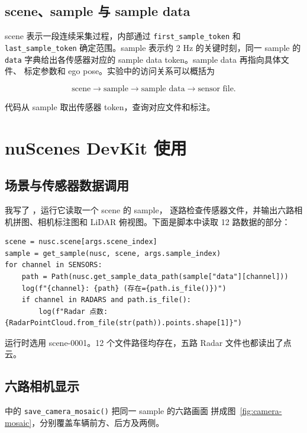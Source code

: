 \documentclass[UTF8,zihao=5,scheme=chinese]{ctexart}
\begin{document}
\subsection{scene、sample 与 sample data}

scene 表示一段连续采集过程，内部通过 \texttt{first\_sample\_token} 和
\texttt{last\_sample\_token} 确定范围。sample 表示约 2 Hz 的关键时刻，同一 sample 的
\texttt{data} 字典给出各传感器对应的 sample data token。sample data 再指向具体文件、
标定参数和 ego pose。实验中的访问关系可以概括为

\begin{equation}
  \text{scene} \rightarrow \text{sample} \rightarrow
  \text{sample data} \rightarrow \text{sensor file}.
\end{equation}

代码从 sample 取出传感器 token，查询对应文件和标注。

\section{nuScenes DevKit 使用}

\subsection{场景与传感器数据调用}

我写了 ，运行它读取一个 scene 的 sample，
逐路检查传感器文件，并输出六路相机拼图、相机标注图和 LiDAR 俯视图。下面是脚本中读取
12 路数据的部分：

\begin{verbatim}
scene = nusc.scene[args.scene_index]
sample = get_sample(nusc, scene, args.sample_index)
for channel in SENSORS:
    path = Path(nusc.get_sample_data_path(sample["data"][channel]))
    log(f"{channel}: {path} (存在={path.is_file()})")
    if channel in RADARS and path.is_file():
        log(f"Radar 点数: {RadarPointCloud.from_file(str(path)).points.shape[1]}")
\end{verbatim}

运行时选用 scene-0001。12 个文件路径均存在，五路 Radar 文件也都读出了点云。

\subsection{六路相机显示}

 中的 \texttt{save\_camera\_mosaic()} 把同一 sample 的六路画面
拼成图~\ref{fig:camera-mosaic}，分别覆盖车辆前方、后方及两侧。
\end{document}
